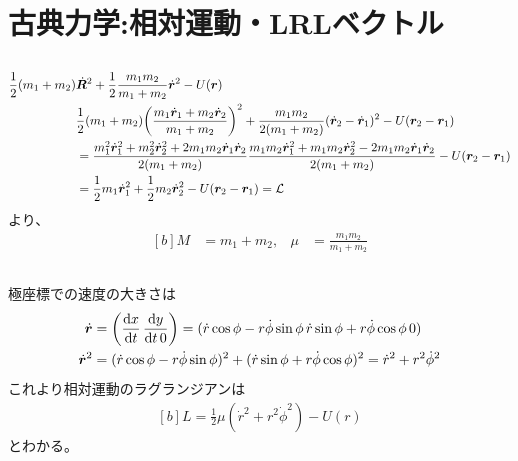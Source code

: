 \documentclass[../ap_2014.tex]{subfiles}
\begin{document}
\setcounter{chapter}{0}
\chapter{古典力学:相対運動・LRLベクトル}
\section{}
\begin{equation}\begin{aligned}[b]
    \frac{1}{2}(m_1+m_2)&\dot{\vb*{R}}^2+\frac{1}{2}\frac{m_1m_2}{m_1+m_2}\dot{\vb*{r}}^2-U(\vb*{r})\\
    &\frac{1}{2}(m_1+m_2)\qty(\frac{m_1\dot{\vb*{r}}_1+m_2\dot{\vb*{r}}_2}{m_1+m_2})^2+\frac{m_1m_2}{2(m_1+m_2)}(\dot{\vb*{r}}_2-\dot{\vb*{r}}_1)^2-U(\vb*{r}_2-\vb*{r}_1)\\
    &=\frac{m_1^2\dot{\vb*{r}}_1^2+m_2^2\dot{\vb*{r}}_2^2+2m_1m_2\dot{\vb*{r}}_1\dot{\vb*{r}}_2}{2(m_1+m_2)}
    \frac{m_1m_2\dot{\vb*{r}}_1^2+m_1m_2\dot{\vb*{r}}_2^2-2m_1m_2\dot{\vb*{r}}_1\dot{\vb*{r}}_2}{2(m_1+m_2)}-U(\vb*{r}_2-\vb*{r}_1)\\
    &= \frac{1}{2}m_1 \dot{\vb*{r}}_1^2+\frac{1}{2}m_2 \dot{\vb*{r}}_2^2-U(\vb*{r}_2-\vb*{r}_1)
    = \mathcal{L}
\end{aligned}\end{equation}
より、
\begin{equation}\begin{aligned}[b]
    M&=m_1+m_2, & \mu &= \frac{m_1m_2}{m_1+m_2}
\end{aligned}\end{equation}

\section{}
極座標での速度の大きさは
\begin{equation}\begin{aligned}[b]
    \dot{\vb*{r}}&=\qty(\dv{x}{t}\,\dv{y}{t\,0})=(\dot{r}\cos\phi-r\dot{\phi}\sin\phi\, \dot{r}\sin\phi +r\dot{\phi}\cos\phi\, 0)\\
    \dot{\vb*{r}}^2 &=(\dot{r}\cos\phi-r\dot{\phi}\sin\phi)^2+(\dot{r}\sin\phi +r\dot{\phi}\cos\phi)^2 = \dot{r}^2+r^2\dot{\phi}^2
\end{aligned}\end{equation}
これより相対運動のラグランジアンは
\begin{equation}\begin{aligned}[b]
    L = \frac{1}{2}\mu(\dot{r}^2+r^2\dot{\phi}^2)-U(r)
\end{aligned}\end{equation}
とわかる。
\end{document}
